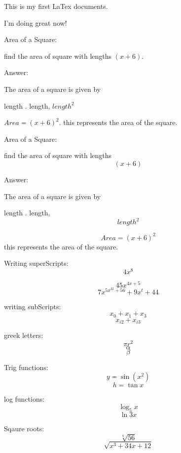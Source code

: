 \documentclass[11pt]{article}
\begin{document}
This is my first LaTex documents.

I'm doing great now!

Area of a Square:

find the area of square with lengths $(x+6)$.

Answer:

The area of a square is given by


length $.$ length, $length^2$

$Area = (x+6)^2$. this represents the area of the square.


Area of a Square:

find the area of square with lengths $$(x+6)$$

Answer:

The area of a square is given by


length $.$ length, $$length^2$$

$$Area = (x+6)^2$$this represents the area of the square.


Writing superScripts: $$4x^8$$

$$45x^{4x+5}$$
$$7x^{5x^{32}+56} + 9x^t + 44$$



writing subScripts: $$x_0 + x_1 + x_3$$
$$x_{i2}+x_{i3}$$


greek letters:
$$\pi r^2$$
$$\alpha$$
$$\beta$$


Trig functions:
$$y=\sin(x^2)$$
$$h=\tan{x}$$


log functions:$$\log_5{x}$$
$$\ln{3x}$$


Sqaure roots:
$$\sqrt[4]{56}$$
$$\sqrt{x^3+34x+12}$$
\end{document}
